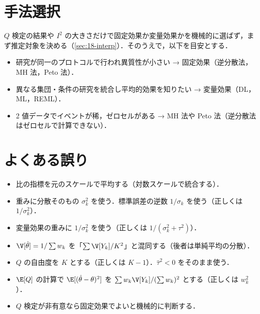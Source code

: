 \section{手法選択}\label{sec:18-choice}
\Youchui $Q$ 検定の結果や $I^2$ の大きさだけで固定効果か変量効果かを機械的に選ばず，まず推定対象を決める（\cref{sec:18-interp}）．そのうえで，以下を目安とする．
\begin{itemize}
\item 研究が同一のプロトコルで行われ異質性が小さい → 固定効果（逆分散法，MH 法，Peto 法）．
\item 異なる集団・条件の研究を統合し平均的効果を知りたい → 変量効果（DL，ML，REML）．
\item 2 値データでイベントが稀，ゼロセルがある → MH 法や Peto 法（逆分散法はゼロセルで計算できない）．
\end{itemize}

\section{よくある誤り}\label{sec:18-err}
\begin{warnbox}
\begin{itemize}
\item 比の指標を元のスケールで平均する（対数スケールで統合する）．
\item 重みに分散そのもの $\sigma_k^2$ を使う．標準誤差の逆数 $1/\sigma_k$ を使う（正しくは $1/\sigma_k^2$）．
\item 変量効果の重みに $1/\sigma_k^2$ を使う（正しくは $1/(\sigma_k^2+\tau^2)$）．
\item $\V[\hat\theta]=1/\sum w_k$ を「$\sum\V[Y_k]/K^2$」と混同する（後者は単純平均の分散）．
\item $Q$ の自由度を $K$ とする（正しくは $K-1$）．$\hat\tau^2<0$ をそのまま使う．
\item $\E[Q]$ の計算で $\E[(\hat\theta-\theta)^2]$ を $\sum w_k\V[Y_k]/(\sum w_k)^2$ とする（正しくは $w_k^2$）．
\item $Q$ 検定が非有意なら固定効果でよいと機械的に判断する．
\end{itemize}
\end{warnbox}

